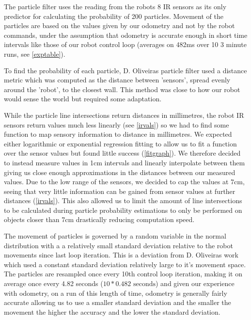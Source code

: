 \documentclass[paper=a4, fontsize=12pt]{scrartcl}	%
\numberwithin{equation}{section}		%
\numberwithin{figure}{section}			%
\numberwithin{table}{section}				%
\begin{document}
The particle filter uses the reading from the robots 8 IR sensors as its only predictor for calculating the probability of 200 particles. Movement of the particles are based on the values given by our odometry and not by the robot commands, under the assumption that odometry is accurate enough in short time intervals like those of our robot control loop (averages on 482ms over 10 3 minute runs, see \ref{exptable}).

To find the probability of each particle, D. Oliveiras particle filter used a distance metric which was computed as the distance between 'sensors', spread evenly around the 'robot', to the closest wall. This method was close to how our robot would sense the world but required some adaptation. 

While the particle line intersections return distances in millimetres, the robot IR sensors return values much less linearly (see \ref{irvals}) so we had to find some function to map sensory information to distance in millimetres. We expected either logarithmic or exponential regression fitting to allow us to fit a function over the sensor values but found little success (\ref{fitgraph})\cite{wolfram}. We therefore decided to instead measure values in 1cm intervals and linearly interpolate between them giving us close enough approximations in the distances between our measured values. Due to the low range of the sensors, we decided to cap the values at 7cm, seeing that very little information can be gained from sensor values at further distances (\ref{irvals}). This also allowed us to limit the amount of line intersections to be calculated during particle probability estimations to only be performed on objects closer than 7cm drastically reducing computation speed. 

The movement of particles is governed by a random variable in the normal distribution with a a relatively small standard deviation relative to the robot movements since last loop iteration. This is a deviation from D. Oliveiras work which used a constant standard deviation relatively large to it's movement space. The particles are resampled once every 10th control loop iteration, making it on average once every 4.82 seconds (\(10* 0.482\text{ seconds}\)) and given our experience with odometry, on a run of this length of time, odometry is generally fairly accurate allowing us to use a smaller standard deviation and the smaller the movement the higher the accuracy and the lower the standard deviation.
\end{document}
